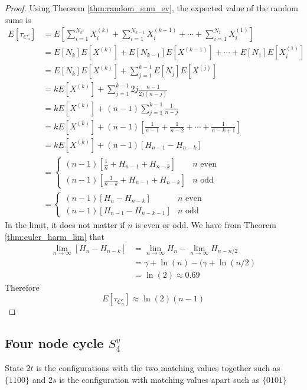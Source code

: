 \begin{proof}
Using Theorem \ref{thm:random_sum_ev}, the expected value of the random sums is
\begin{align*}
    E[\tau_{C_n^{v}}] &= E\left[\sum_{i = 1}^{N_k} X_i^{(k)} + \sum_{i = 1}^{N_{k - 1}} X_i^{(k - 1)} + \cdots + \sum_{i = 1}^{N_1} X_i^{(1)}\right]\\
    &= E[N_k] E[X^{(k)}] + E[N_{k - 1}] E[X^{(k - 1)}] + \cdots + E[N_1]E[X_i^{(1)}]\\
    &= E[N_k] E[X^{(k)}] + \sum_{j = 1}^{k - 1} E[N_j]E[X^{(j)}]\\
    &= k E[X^{(k)}] + \sum_{j = 1}^{k - 1} 2j \frac{n - 1}{2j (n - j)} \\
    &= k E[X^{(k)}] + (n - 1) \sum_{j = 1}^{k - 1} \frac{1}{n - j}\\
    &= k E[X^{(k)}] + (n - 1) \left[ \frac{1}{n - 1} + \frac{1}{n - 2} + \cdots + \frac{1}{n - k + 1} \right]\\
    &= k E[X^{(k)}] + (n - 1) \left[ H_{n - 1} - H_{n - k} \right]\\
    &= \begin{cases}
    (n - 1) \left[\frac{1}{n} + H_{n - 1} + H_{n - k}\right] & n \text{ even}\\
    (n - 1) \left[\frac{1}{n - k} + H_{n - 1} + H_{n - k}\right] & n \text{ odd}
    \end{cases}\\
    &= \begin{cases}
    (n - 1) \left[H_{n} - H_{n - k}\right] & n \text{ even}\\
    (n - 1) \left[H_{n - 1} - H_{n - k - 1}\right] & n \text{ odd}
\end{cases}
\end{align*}
In the limit, it does not matter if $n$ is even or odd.
We have from Theorem \ref{thm:euler_harm_lim} that
\begin{align*}
    \lim_{n \to \infty} [H_{n} - H_{n - k}] &=  \lim_{n \to \infty} H_{n} - \lim_{n \to \infty}  H_{n - n/2}\\
    &= \gamma + \ln(n) - (\gamma + \ln(n/2)\\
    &= \ln(2) \approx 0.69
\end{align*}
Therefore
$$
E[\tau_{C_n^{v}}] \approx \ln(2) (n - 1)
$$
\end{proof}

\subsection{Four node cycle \texorpdfstring{$S^{v}_4$}{VS4}}
State $2t$ is the configurations with the two matching values together such as $\{1100\}$ and $2s$ is the configuration with matching values apart such as $\{0101\}$

